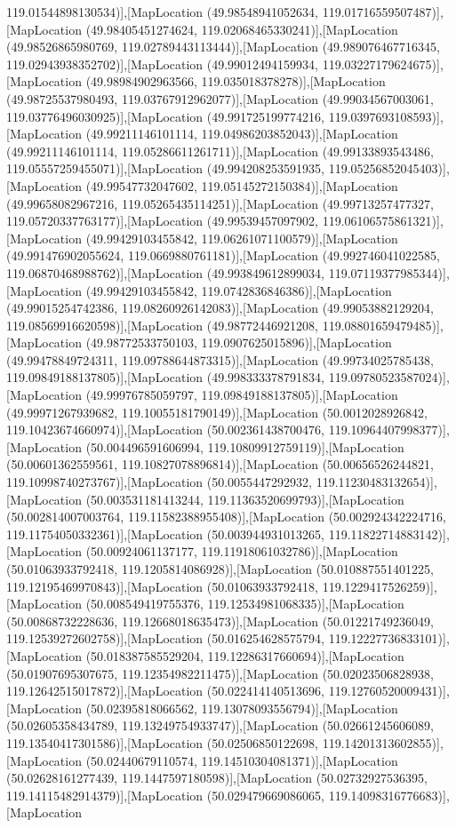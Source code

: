 119.01544898130534)],[MapLocation (49.98548941052634, 119.01716559507487)],[MapLocation (49.98405451274624, 119.02068465330241)],[MapLocation (49.98526865980769, 119.02789443113444)],[MapLocation (49.989076467716345, 119.02943938352702)],[MapLocation (49.99012494159934, 119.03227179624675)],[MapLocation (49.98984902963566, 119.035018378278)],[MapLocation (49.98725537980493, 119.03767912962077)],[MapLocation (49.99034567003061, 119.03776496030925)],[MapLocation (49.991725199774216, 119.0397693108593)],[MapLocation (49.99211146101114, 119.04986203852043)],[MapLocation (49.99211146101114, 119.05286611261711)],[MapLocation (49.99133893543486, 119.05557259455071)],[MapLocation (49.994208253591935, 119.05256852045403)],[MapLocation (49.99547732047602, 119.05145272150384)],[MapLocation (49.99658082967216, 119.05265435114251)],[MapLocation (49.99713257477327, 119.05720337763177)],[MapLocation (49.99539457097902, 119.06106575861321)],[MapLocation (49.99429103455842, 119.06261071100579)],[MapLocation (49.991476902055624, 119.0669880761181)],[MapLocation (49.992746041022585, 119.06870468988762)],[MapLocation (49.993849612899034, 119.07119377985344)],[MapLocation (49.99429103455842, 119.0742836846386)],[MapLocation (49.99015254742386, 119.08260926142083)],[MapLocation (49.99053882129204, 119.08569916620598)],[MapLocation (49.98772446921208, 119.08801659479485)],[MapLocation (49.98772533750103, 119.0907625015896)],[MapLocation (49.99478849724311, 119.09788644873315)],[MapLocation (49.99734025785438, 119.09849188137805)],[MapLocation (49.998333378791834, 119.09780523587024)],[MapLocation (49.99976785059797, 119.09849188137805)],[MapLocation (49.99971267939682, 119.10055181790149)],[MapLocation (50.0012028926842, 119.10423674660974)],[MapLocation (50.002361438700476, 119.10964407998377)],[MapLocation (50.004496591606994, 119.10809912759119)],[MapLocation (50.00601362559561, 119.10827078896814)],[MapLocation (50.00656526244821, 119.10998740273767)],[MapLocation (50.0055447292932, 119.11230483132654)],[MapLocation (50.003531181413244, 119.11363520699793)],[MapLocation (50.002814007003764, 119.11582388955408)],[MapLocation (50.002924342224716, 119.11754050332361)],[MapLocation (50.003944931013265, 119.11822714883142)],[MapLocation (50.00924061137177, 119.11918061032786)],[MapLocation (50.01063933792418, 119.1205814086928)],[MapLocation (50.010887551401225, 119.12195469970843)],[MapLocation (50.01063933792418, 119.1229417526259)],[MapLocation (50.008549419755376, 119.12534981068335)],[MapLocation (50.00868732228636, 119.12668018635473)],[MapLocation (50.01221749236049, 119.12539272602758)],[MapLocation (50.016254628575794, 119.12227736833101)],[MapLocation (50.018387585529204, 119.12286317660694)],[MapLocation (50.01907695307675, 119.12354982211475)],[MapLocation (50.02023506828938, 119.12642515017872)],[MapLocation (50.022414140513696, 119.12760520009431)],[MapLocation (50.02395818066562, 119.13078093556794)],[MapLocation (50.02605358434789, 119.13249754933747)],[MapLocation (50.02661245606089, 119.13540417301586)],[MapLocation (50.02506850122698, 119.14201313602855)],[MapLocation (50.02440679110574, 119.14510304081371)],[MapLocation (50.02628161277439, 119.1447597180598)],[MapLocation (50.02732927536395, 119.14115482914379)],[MapLocation (50.029479669086065, 119.14098316776683)],[MapLocation 